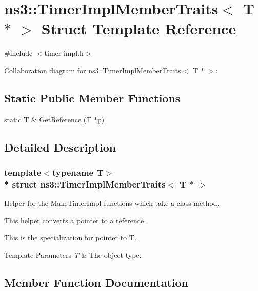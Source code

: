 \hypertarget{structns3_1_1TimerImplMemberTraits_3_01T_01_5_01_4}{}\section{ns3\+:\+:Timer\+Impl\+Member\+Traits$<$ T $\ast$ $>$ Struct Template Reference}
\label{structns3_1_1TimerImplMemberTraits_3_01T_01_5_01_4}


{\ttfamily \#include $<$timer-\/impl.\+h$>$}



Collaboration diagram for ns3\+:\+:Timer\+Impl\+Member\+Traits$<$ T $\ast$ $>$\+:
\subsection*{Static Public Member Functions}
\begin{DoxyCompactItemize}
\item 
static T \& \hyperlink{structns3_1_1TimerImplMemberTraits_3_01T_01_5_01_4_a79c5bea4adf411a756247c6fe36365e3}{Get\+Reference} (T $\ast$\hyperlink{lte__link__budget__x2__handover__measures_8m_ac9de518908a968428863f829398a4e62}{p})
\end{DoxyCompactItemize}


\subsection{Detailed Description}
\subsubsection*{template$<$typename T$>$\\*
struct ns3\+::\+Timer\+Impl\+Member\+Traits$<$ T $\ast$ $>$}

Helper for the Make\+Timer\+Impl functions which take a class method.

This helper converts a pointer to a reference.

This is the specialization for pointer to {\ttfamily T}.


\begin{DoxyTemplParams}{Template Parameters}
{\em T} & The object type. \\
\hline
\end{DoxyTemplParams}


\subsection{Member Function Documentation}
